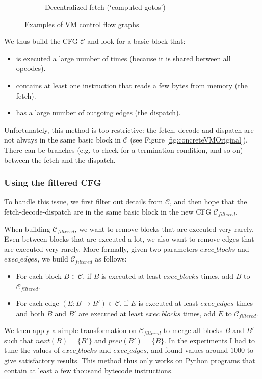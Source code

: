 \documentclass[english]{article}
\begin{document}
\begin{figure}[htp]
\begin{subfigure}{.5\textwidth}
		\caption{Decentralized fetch (`computed-gotos')}
		\label{fig:abstractVM:Decentralized}
	\end{subfigure}
	\caption{Examples of VM control flow graphs}
	\label{fig:abstractVM}
\end{figure}

We thus build the CFG $\mathcal{C}$ and look for a basic block that:
\begin{itemize}
	\item is executed a large number of times (because it is shared between all opcodes).
	\item contains at least one instruction that reads a few bytes from memory (the fetch).
	\item has a large number of outgoing edges (the dispatch).
\end{itemize} 

Unfortunately, this method is too restrictive: the fetch, decode and dispatch are not always in the same basic block in $\mathcal{C}$ (see Figure \ref{fig:concreteVMOriginal}). There can be branches (e.g. to check for a termination condition, and so on) between the fetch and the dispatch. 

\subsubsection{Using the filtered CFG}

To handle this issue, we first filter out details from $\mathcal{C}$, and then hope that the fetch-decode-dispatch are in the same basic block in the new CFG $\mathcal{C}_{filtered}$. 

When building $\mathcal{C}_{filtered}$, we want to remove blocks that are executed very rarely. Even between blocks that are executed a lot, we also want to remove edges that are executed very rarely. More formally, given two parameters $exec\_blocks$ and $exec\_edges$, we build $\mathcal{C}_{filtered}$ as follows: 
\begin{itemize}
	\item For each block $B \in \mathcal{C}$, if $B$ is executed at least $exec\_blocks$ times, add $B$ to $\mathcal{C}_{filtered}$.
	\item For each edge $(E: B \rightarrow B') \in \mathcal{C}$, if $E$ is executed at least $exec\_edges$ times and both $B$ and $B'$ are executed at least $exec\_blocks$ times, add $E$ to $\mathcal{C}_{filtered}$.
\end{itemize}
We then apply a simple transformation on $\mathcal{C}_{filtered}$ to merge all blocks $B$ and $B'$ such that $next(B) = \{B'\}$ and $prev(B') = \{B\}$. In the experiments I had to tune the values of $exec\_blocks$ and $exec\_edges$, and found values around $1000$ to give satisfactory results. This method thus only works on Python programs that contain at least a few thousand bytecode instructions.
\end{document}
